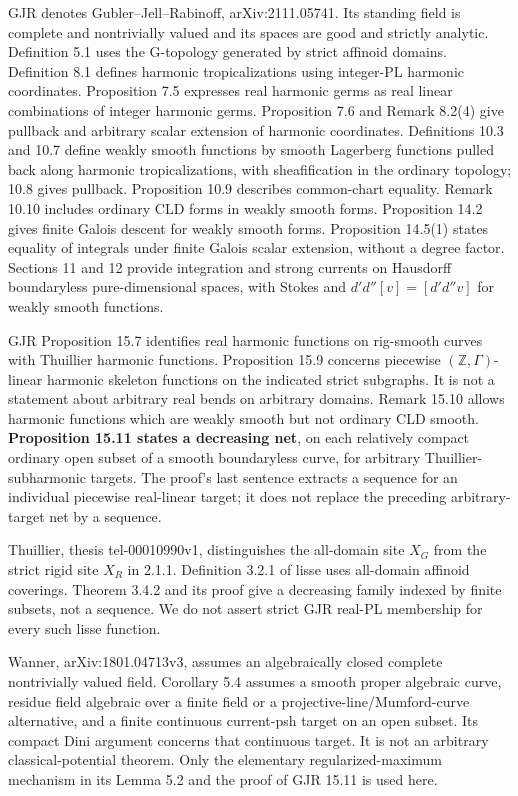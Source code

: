 \documentclass[11pt]{article}
\begin{document}
GJR denotes Gubler--Jell--Rabinoff, arXiv:2111.05741. Its standing field is complete and nontrivially valued and its spaces are good and strictly analytic. Definition 5.1 uses the G-topology generated by strict affinoid domains. Definition 8.1 defines harmonic tropicalizations using integer-PL harmonic coordinates. Proposition 7.5 expresses real harmonic germs as real linear combinations of integer harmonic germs. Proposition 7.6 and Remark 8.2(4) give pullback and arbitrary scalar extension of harmonic coordinates. Definitions 10.3 and 10.7 define weakly smooth functions by smooth Lagerberg functions pulled back along harmonic tropicalizations, with sheafification in the ordinary topology; 10.8 gives pullback. Proposition 10.9 describes common-chart equality. Remark 10.10 includes ordinary CLD forms in weakly smooth forms. Proposition 14.2 gives finite Galois descent for weakly smooth forms. Proposition 14.5(1) states equality of integrals under finite Galois scalar extension, without a degree factor. Sections 11 and 12 provide integration and strong currents on Hausdorff boundaryless pure-dimensional spaces, with Stokes and \(d'd''[v]=[d'd''v]\) for weakly smooth functions.

GJR Proposition 15.7 identifies real harmonic functions on rig-smooth curves with Thuillier harmonic functions. Proposition 15.9 concerns piecewise \((\mathbb Z,\Gamma)\)-linear harmonic skeleton functions on the indicated strict subgraphs. It is not a statement about arbitrary real bends on arbitrary domains. Remark 15.10 allows harmonic functions which are weakly smooth but not ordinary CLD smooth. \textbf{Proposition 15.11 states a decreasing net}, on each relatively compact ordinary open subset of a smooth boundaryless curve, for arbitrary Thuillier-subharmonic targets. The proof's last sentence extracts a sequence for an individual piecewise real-linear target; it does not replace the preceding arbitrary-target net by a sequence.

Thuillier, thesis tel-00010990v1, distinguishes the all-domain site \(X_G\) from the strict rigid site \(X_R\) in 2.1.1. Definition 3.2.1 of lisse uses all-domain affinoid coverings. Theorem 3.4.2 and its proof give a decreasing family indexed by finite subsets, not a sequence. We do not assert strict GJR real-PL membership for every such lisse function.

Wanner, arXiv:1801.04713v3, assumes an algebraically closed complete nontrivially valued field. Corollary 5.4 assumes a smooth proper algebraic curve, residue field algebraic over a finite field or a projective-line/Mumford-curve alternative, and a finite continuous current-psh target on an open subset. Its compact Dini argument concerns that continuous target. It is not an arbitrary classical-potential theorem. Only the elementary regularized-maximum mechanism in its Lemma 5.2 and the proof of GJR 15.11 is used here.
\end{document}
